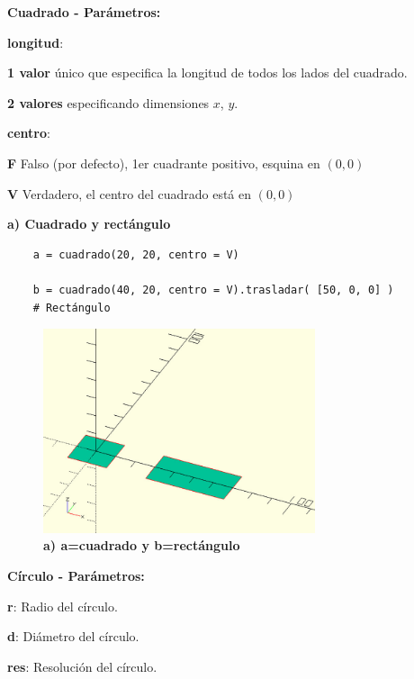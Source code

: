 \begin{description}
\item  \textbf{Cuadrado - Parámetros:}
\item   \textbf{longitud}:
\begin{description}
\item \textbf{1 valor} único que especifica la longitud de todos los lados del cuadrado.
\item \textbf{2 valores} especificando dimensiones $x$, $y$.
\end{description}
\item   \textbf{centro}:
\begin{description}
\item \textbf{F} Falso (por defecto), 1er cuadrante positivo, esquina en $(0, 0)$
\item \textbf{V} Verdadero, el centro del cuadrado está en $(0, 0)$
\end{description}
\end{description}

\textbf{a) Cuadrado y rectángulo} 

\begin{listing}[ht]
\begin{verbatim}
    a = cuadrado(20, 20, centro = V)
    
    b = cuadrado(40, 20, centro = V).trasladar( [50, 0, 0] ) 
    # Rectángulo
\end{verbatim}
\end{listing}

\begin{figure}[h]
\includegraphics[width=8cm]{Img/Modelos/modelado17.jpg}
\centering
\caption{\textbf{ \footnotesize{a) a=cuadrado y b=rectángulo}}}
\end{figure}

\clearpage
\begin{description}
\item \textbf{Círculo - Parámetros:}
\item  \textbf{r}: Radio del círculo.
\item  \textbf{d}: Diámetro del círculo.
\item  \textbf{res}: Resolución del círculo.
\end{description}


